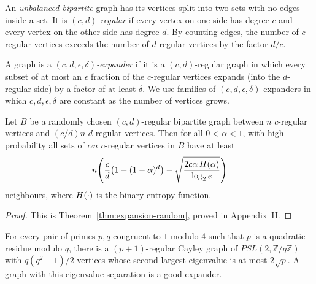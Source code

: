 \begin{definition}
  \label{def:cd-regular}
  An \emph{unbalanced bipartite} graph has its vertices split into two sets with
  no edges inside a set. It is \emph{$(c,d)$-regular} if every vertex on one
  side has degree $c$ and every vertex on the other side has degree $d$. By
  counting edges, the number of $c$-regular vertices exceeds the number of
  $d$-regular vertices by the factor $d/c$.
\end{definition}

\begin{definition}
  \label{def:cdes-expander}
  A graph is a \emph{$(c,d,\epsilon,\delta)$-expander} if it is a $(c,d)$-regular
  graph in which every subset of at most an $\epsilon$ fraction of the
  $c$-regular vertices expands (into the $d$-regular side) by a factor of at
  least $\delta$. We use families of $(c,d,\epsilon,\delta)$-expanders in which
  $c,d,\epsilon,\delta$ are constant as the number of vertices grows.
\end{definition}

\begin{proposition}
  \label{prop:random-expander}
  Let $B$ be a randomly chosen $(c,d)$-regular bipartite graph between $n$
  $c$-regular vertices and $(c/d)n$ $d$-regular vertices. Then for all
  $0<\alpha<1$, with high probability all sets of $\alpha n$ $c$-regular
  vertices in $B$ have at least
  \[
    n\!\left(\frac{c}{d}\bigl(1-(1-\alpha)^d\bigr)
      - \sqrt{\frac{2c\alpha\,H(\alpha)}{\log_2 e}}\right)
  \]
  neighbours, where $H(\cdot)$ is the binary entropy function.
\end{proposition}
\begin{proof}
  This is Theorem~\ref{thm:expansion-random}, proved in Appendix~II.
\end{proof}

\begin{theorem}
  \label{thm:lps-margulis}
  \notready
  For every pair of primes $p,q$ congruent to $1$ modulo $4$ such that $p$ is a
  quadratic residue modulo $q$, there is a $(p+1)$-regular Cayley graph of
  $PSL(2,\mathbb{Z}/q\mathbb{Z})$ with $q(q^2-1)/2$ vertices whose
  second-largest eigenvalue is at most $2\sqrt{p}$. A graph with this eigenvalue
  separation is a good expander.
\end{theorem}

